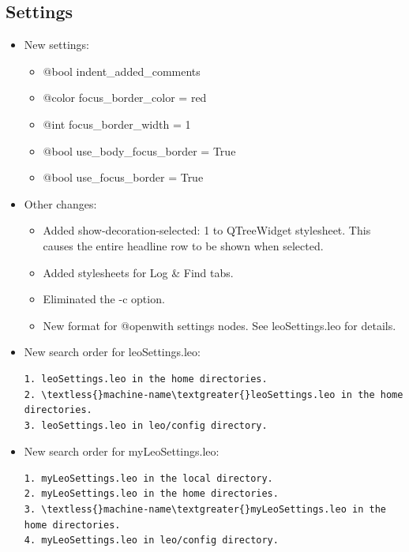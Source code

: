 \documentclass[a4paper,10pt,english]{sphinxmanual}
\begin{document}
\subsection{Settings}
\label{what-is-new:settings}\begin{itemize}
\item {} 
New settings:
\begin{itemize}
\item {} 
@bool indent\_added\_comments

\item {} 
@color focus\_border\_color = red

\item {} 
@int focus\_border\_width = 1

\item {} 
@bool use\_body\_focus\_border  = True

\item {} 
@bool use\_focus\_border = True

\end{itemize}

\item {} 
Other changes:
\begin{itemize}
\item {} 
Added show-decoration-selected: 1 to QTreeWidget stylesheet. This causes
the entire headline row to be shown when selected.

\item {} 
Added stylesheets for Log \& Find tabs.

\item {} 
Eliminated the -c option.

\item {} 
New format for @openwith settings nodes. See leoSettings.leo for details.

\end{itemize}

\item {} 
New search order for leoSettings.leo:

\begin{Verbatim}[commandchars=\\\{\}]
1. leoSettings.leo in the home directories.
2. \textless{}machine-name\textgreater{}leoSettings.leo in the home directories.
3. leoSettings.leo in leo/config directory.
\end{Verbatim}

\item {} 
New search order for myLeoSettings.leo:

\begin{Verbatim}[commandchars=\\\{\}]
1. myLeoSettings.leo in the local directory.
2. myLeoSettings.leo in the home directories.
3. \textless{}machine-name\textgreater{}myLeoSettings.leo in the home directories.
4. myLeoSettings.leo in leo/config directory.
\end{Verbatim}


\end{itemize}
\end{document}
